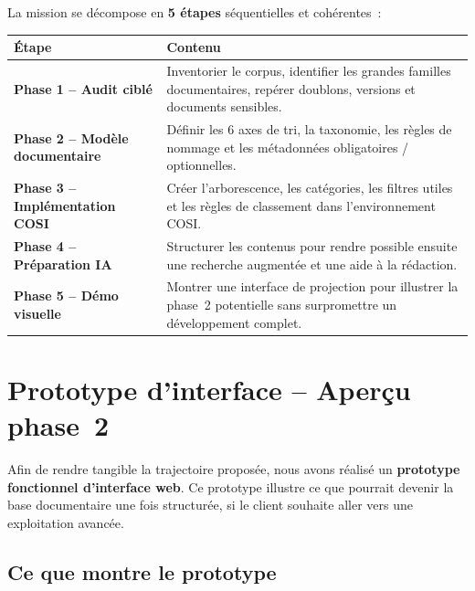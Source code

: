 \documentclass[12pt, a4paper]{article}
\begin{document}
La mission se décompose en \textbf{5 étapes} séquentielles et cohérentes~:

\begin{center}
\renewcommand{\arraystretch}{1.5}
\begin{tabularx}{\textwidth}{>{\bfseries\small\color{bleuprofond}}l X}
\toprule
\textbf{Étape} & \textbf{Contenu} \\
\midrule
Phase 1 -- Audit ciblé & Inventorier le corpus, identifier les grandes familles documentaires, repérer doublons, versions et documents sensibles. \\
\midrule
Phase 2 -- Modèle documentaire & Définir les 6 axes de tri, la taxonomie, les règles de nommage et les métadonnées obligatoires / optionnelles. \\
\midrule
Phase 3 -- Implémentation COSI & Créer l'arborescence, les catégories, les filtres utiles et les règles de classement dans l'environnement COSI. \\
\midrule
Phase 4 -- Préparation IA & Structurer les contenus pour rendre possible ensuite une recherche augmentée et une aide à la rédaction. \\
\midrule
Phase 5 -- Démo visuelle & Montrer une interface de projection pour illustrer la phase~2 potentielle sans surpromettre un développement complet. \\
\bottomrule
\end{tabularx}
\end{center}

\section{Prototype d'interface -- Aperçu phase~2}

Afin de rendre tangible la trajectoire proposée, nous avons réalisé un \textbf{prototype fonctionnel d'interface web}. Ce prototype illustre ce que pourrait devenir la base documentaire une fois structurée, si le client souhaite aller vers une exploitation avancée.

\subsection{Ce que montre le prototype}
\end{document}
